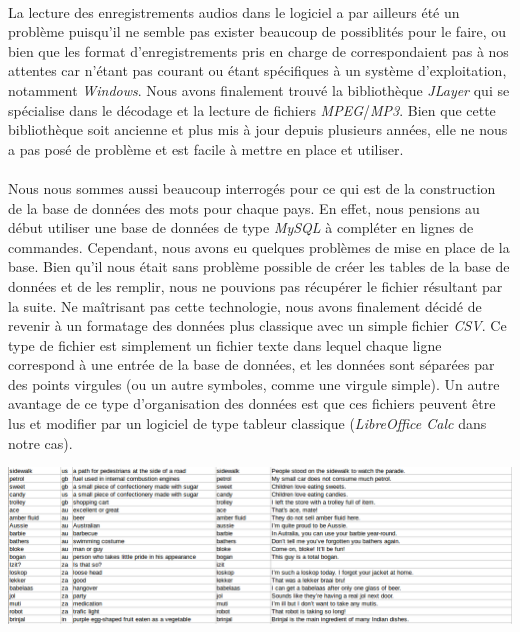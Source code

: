 \documentclass[11pt, a4paper]{report}
\begin{document}
\paragraph{}La lecture des enregistrements audios dans le logiciel a par ailleurs été un problème puisqu'il ne semble pas exister beaucoup de possiblités pour le faire, ou bien que les format d'enregistrements pris en charge de correspondaient pas à nos attentes car n'étant pas courant ou étant spécifiques à un système d'exploitation, notamment \textit{Windows}. Nous avons finalement trouvé la bibliothèque \textit{JLayer} qui se spécialise dans le décodage et la lecture de fichiers \textit{MPEG}/\textit{MP3}. Bien que cette bibliothèque soit ancienne et plus mis à jour depuis plusieurs années, elle ne nous a pas posé de problème et est facile à mettre en place et utiliser.

\paragraph{}Nous nous sommes aussi beaucoup interrogés pour ce qui est de la construction de la base de données des mots pour chaque pays. En effet, nous pensions au début utiliser une base de données de type \textit{MySQL} à compléter en lignes de commandes. Cependant, nous avons eu quelques problèmes de mise en place de la base. Bien qu'il nous était sans problème possible de créer les tables de la base de données et de les remplir, nous ne pouvions pas récupérer le fichier résultant par la suite. Ne maîtrisant pas cette technologie, nous avons finalement décidé de revenir à un formatage des données plus classique avec un simple fichier \textit{CSV}. Ce type de fichier est simplement un fichier texte dans lequel chaque ligne correspond à une entrée de la base de données, et les données sont séparées par des points virgules (ou un autre symboles, comme une virgule simple).
Un autre avantage de ce type d'organisation des données est que ces fichiers peuvent être lus et modifier par un logiciel de type tableur classique (\textit{LibreOffice Calc} dans notre cas).

\vspace{0.5cm}
\centerline{\includegraphics[scale=0.4]{images/database.png}}
\end{document}
